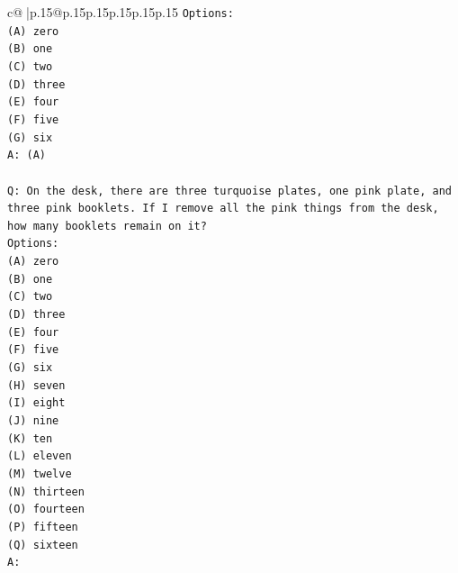 \documentclass{article}
\begin{document}
{\begin{supertabular}{c@{$\;$}|p{.15\linewidth}@{}p{.15\linewidth}p{.15\linewidth}p{.15\linewidth}p{.15\linewidth}p{.15\linewidth}}
{{{\texttt{Options:} \\
\texttt{(A) zero} \\
\texttt{(B) one} \\
\texttt{(C) two} \\
\texttt{(D) three} \\
\texttt{(E) four} \\
\texttt{(F) five} \\
\texttt{(G) six} \\
\texttt{A: (A)} \\
\\ 
\texttt{Q: On the desk, there are three turquoise plates, one pink plate, and three pink booklets. If I remove all the pink things from the desk, how many booklets remain on it?} \\
\texttt{Options:} \\
\texttt{(A) zero} \\
\texttt{(B) one} \\
\texttt{(C) two} \\
\texttt{(D) three} \\
\texttt{(E) four} \\
\texttt{(F) five} \\
\texttt{(G) six} \\
\texttt{(H) seven} \\
\texttt{(I) eight} \\
\texttt{(J) nine} \\
\texttt{(K) ten} \\
\texttt{(L) eleven} \\
\texttt{(M) twelve} \\
\texttt{(N) thirteen} \\
\texttt{(O) fourteen} \\
\texttt{(P) fifteen} \\
\texttt{(Q) sixteen} \\
\texttt{A:} \\
            }
        }
    }
     \\ \\


\end{supertabular}}
\end{document}
